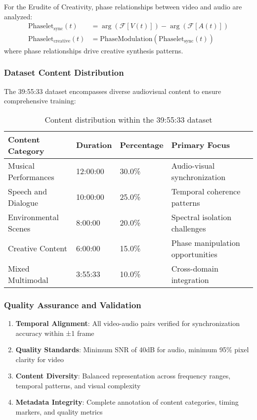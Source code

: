 \begin{definition}
For the Erudite of Creativity, phase relationships between video and audio are analyzed:
\begin{align}
\text{Phaselet}_{\text{sync}}(t) &= \arg(\mathcal{F}[V(t)]) - \arg(\mathcal{F}[A(t)]) \\
\text{Phaselet}_{\text{creative}}(t) &= \text{PhaseModulation}(\text{Phaselet}_{\text{sync}}(t))
\end{align}
where phase relationships drive creative synthesis patterns.
\end{definition}

\subsubsection{Dataset Content Distribution}

The 39:55:33 dataset encompasses diverse audiovisual content to ensure comprehensive training:

\begin{table}[h]
\centering
\begin{tabular}{|l|l|l|l|}
\hline
\textbf{Content Category} & \textbf{Duration} & \textbf{Percentage} & \textbf{Primary Focus} \\
\hline
Musical Performances & 12:00:00 & 30.0\% & Audio-visual synchronization \\
\hline
Speech and Dialogue & 10:00:00 & 25.0\% & Temporal coherence patterns \\
\hline
Environmental Scenes & 8:00:00 & 20.0\% & Spectral isolation challenges \\
\hline
Creative Content & 6:00:00 & 15.0\% & Phase manipulation opportunities \\
\hline
Mixed Multimodal & 3:55:33 & 10.0\% & Cross-domain integration \\
\hline
\end{tabular}
\caption{Content distribution within the 39:55:33 dataset}
\end{table}

\subsubsection{Quality Assurance and Validation}

\begin{enumerate}
    \item \textbf{Temporal Alignment}: All video-audio pairs verified for synchronization accuracy within ±1 frame
    \item \textbf{Quality Standards}: Minimum SNR of 40dB for audio, minimum 95\% pixel clarity for video
    \item \textbf{Content Diversity}: Balanced representation across frequency ranges, temporal patterns, and visual complexity
    \item \textbf{Metadata Integrity}: Complete annotation of content categories, timing markers, and quality metrics
\end{enumerate}

